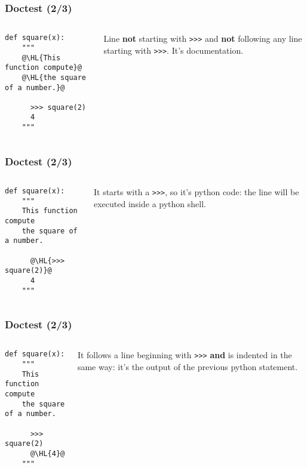 \documentclass[english,serif,mathserif,xcolor=pdftex,dvipsnames,table]{beamer}
\begin{document}
\begin{frame}[fragile]
  \frametitle{Doctest (2/3)}
  \begin{columns}[t]
    \begin{column}{0.6\textwidth}
  \begin{lstlisting}
def square(x):
    """ 
    @\HL{This function compute}@
    @\HL{the square of a number.}@

      >>> square(2)
      4
    """    
  \end{lstlisting}
\end{column}
\begin{column}{0.4\textwidth}
  Line \textbf{not} starting with \texttt{>>>} and \textbf{not}
  following any line starting with \texttt{>>>}. It's documentation.
\end{column}
\end{columns}
\end{frame}

\begin{frame}[fragile]
  \frametitle{Doctest (2/3)}
\begin{columns}[t]
  \begin{column}{0.6\textwidth}
  \begin{lstlisting}
def square(x):
    """ 
    This function compute
    the square of a number.

      @\HL{>>> square(2)}@
      4
    """    
  \end{lstlisting}
\end{column}
\begin{column}{0.4\textwidth}
  It starts with a \texttt{>>>}, so it's python code: the line will be
  executed inside a python shell.
\end{column}
\end{columns}
\end{frame}

\begin{frame}[fragile]
  \frametitle{Doctest (2/3)}
\begin{columns}[t]
  \begin{column}{0.6\textwidth}
  \begin{lstlisting}
def square(x):
    """
    This function compute
    the square of a number.

      >>> square(2)
      @\HL{4}@
    """    
  \end{lstlisting}
\end{column}
\begin{column}{0.4\textwidth}
  It follows a line beginning with \texttt{>>>} \textbf{and} is
  indented in the same way: it's the output of the previous python
  statement.
\end{column}
\end{columns}
\end{frame}
\end{document}
